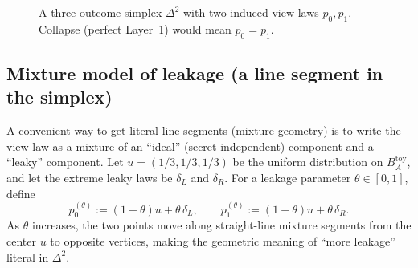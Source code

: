 \documentclass[11pt,a4paper]{article}
\theoremstyle{definition}
\theoremstyle{plain}
\begin{document}
\begin{figure}[ht]
\centering
{}
\caption{A three-outcome simplex $\Delta^2$ with two induced view laws $p_0,p_1$. Collapse (perfect Layer~1) would mean $p_0=p_1$.}
\label{fig:toy-kernel-delta2}
\end{figure}

\subsection{Mixture model of leakage (a line segment in the simplex)}
\label{subsec:toy-mixture-leakage}

A convenient way to get literal line segments (mixture geometry) is to write the view law as a mixture of an ``ideal'' (secret-independent) component and a ``leaky'' component.
Let $u=(1/3,1/3,1/3)$ be the uniform distribution on $B_A^{\mathrm{toy}}$, and let the extreme leaky laws be $\delta_L$ and $\delta_R$.
For a leakage parameter $\theta\in[0,1]$, define
\[
p^{(\theta)}_0 := (1-\theta)u + \theta\,\delta_L,\qquad
p^{(\theta)}_1 := (1-\theta)u + \theta\,\delta_R.
\]
As $\theta$ increases, the two points move along straight-line mixture segments from the center $u$ to opposite vertices, making the geometric meaning of ``more leakage'' literal in $\Delta^2$.
\end{document}
